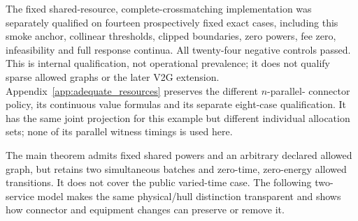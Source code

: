 The fixed shared-resource, complete-crossmatching implementation was
separately qualified on fourteen prospectively fixed exact cases, including
this smoke anchor, collinear thresholds, clipped boundaries, zero powers,
fee zero, infeasibility and full response continua. All twenty-four negative
controls passed. This is internal qualification, not operational prevalence;
it does not qualify sparse allowed graphs or the later V2G extension.
Appendix~\ref{app:adequate_resources} preserves the different $n$-parallel-
connector policy, its continuous value formulas and its separate eight-case
qualification. It has the same joint projection for this example but different
individual allocation sets; none of its parallel witness timings is used here.

The main theorem admits fixed shared powers and an arbitrary declared
allowed graph, but retains two simultaneous batches and zero-time,
zero-energy allowed transitions. It does not cover the public varied-time
case. The following two-service model makes the same physical/hull
distinction transparent and shows how connector and equipment changes can
preserve or remove it.
